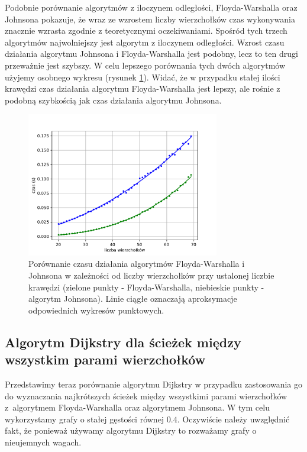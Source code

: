 \documentclass[12pt,a4paper]{book}
\theoremstyle{definition}
\numberwithin{equation}{chapter}
\begin{document}
Podobnie porównanie algorytmów z iloczynem odległości, Floyda-Warshalla oraz Johnsona pokazuje, że wraz ze wzrostem liczby wierzchołków czas wykonywania znacznie wzrasta zgodnie z teoretycznymi oczekiwaniami. Spośród tych trzech algorytmów najwolniejszy jest algorytm z iloczynem odległości. Wzrost czasu działania algorytmu Johnsona i Floyda-Warshalla jest podobny, lecz to ten drugi przeważnie jest szybszy. W celu lepszego porównania tych dwóch algorytmów użyjemy osobnego wykresu (rysunek \ref{rys_wykres_kraw_fw_j}). Widać, że w przypadku stałej ilości krawędzi czas działania algorytmu Floyda-Warshalla jest lepszy, ale rośnie z podobną szybkością jak czas działania algorytmu Johnsona. 

\begin{figure}[H]
\centering
\includegraphics[width=0.75\textwidth]{images/Wykres_stale_krawedzie_Floyd_Warshall_Johnson.pdf}
\caption{Porównanie czasu działania algorytmów Floyda-Warshalla i Johnsona w zależności od liczby wierzchołków przy ustalonej liczbie krawędzi (zielone punkty - Floyda-Warshalla, niebieskie punkty - algorytm Johnsona).  Linie ciągłe oznaczają aproksymacje odpowiednich wykresów punktowych.}
\label{rys_wykres_kraw_fw_j}
\end{figure}

\subsection*{Algorytm Dijkstry dla ścieżek między wszystkim parami wierzchołków}

Przedstawimy teraz porównanie algorytmu Dijkstry w przypadku zastosowania go do wyznaczania najkrótszych ścieżek między wszystkimi parami wierzchołków z~algorytmem Floyda-Warshalla oraz algorytmem Johnsona. W tym celu wykorzystamy  grafy o stałej gęstości równej $0.4$. Oczywiście należy uwzględnić fakt, że ponieważ używamy algorytmu Dijkstry to rozważamy grafy o nieujemnych wagach.
\end{document}
